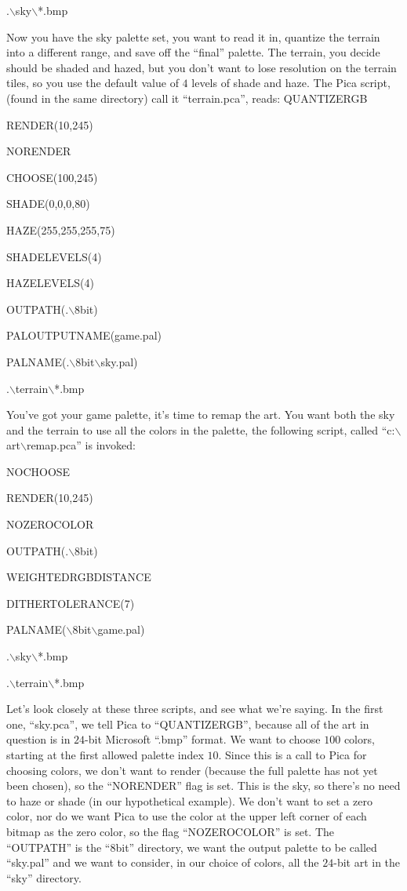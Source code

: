 .$\backslash$sky$\backslash$*.bmp


\newpar Now you have the sky palette set, you want to read it in, quantize the terrain into
a different range, and save off the ``final'' palette. The terrain, you decide should be
shaded and hazed, but you don't want to lose resolution on the terrain tiles, so you use
the default value of $4$ levels of shade and haze. The Pica script, (found in the
same directory) call it ``terrain.pca'', reads:
\vfill\supereject
QUANTIZERGB


RENDER(10,245)


NORENDER


CHOOSE(100,245)


SHADE(0,0,0,80)


HAZE(255,255,255,75)


SHADELEVELS(4)


HAZELEVELS(4)


OUTPATH(.$\backslash$8bit)


PALOUTPUTNAME(game.pal)


PALNAME(.$\backslash$8bit$\backslash$sky.pal)


.$\backslash$terrain$\backslash$*.bmp

\newpar You've got your game palette, it's time to remap the art. You want both the sky
and the terrain to use all the colors in the palette, the following script, called 
``c:$\backslash$art$\backslash$remap.pca'' is invoked:

								
NOCHOOSE


RENDER(10,245)


NOZEROCOLOR


OUTPATH(.$\backslash$8bit)


WEIGHTEDRGBDISTANCE


DITHERTOLERANCE(7)


PALNAME($\backslash$8bit$\backslash$game.pal)


.$\backslash$sky$\backslash$*.bmp


.$\backslash$terrain$\backslash$*.bmp


\newpar Let's look closely at these three scripts, and see what we're saying. In the
first one, ``sky.pca'', we tell Pica to ``QUANTIZERGB'', because all of the art in question
is in $24$-bit Microsoft ``.bmp'' format. We want to choose $100$ colors, starting at the
first allowed palette index	$10$. Since this is a call to Pica for choosing colors, we don't 
want to render (because the full palette has not yet been chosen), so the ``NORENDER'' flag
is set. This is the sky, so there's no need to haze or shade (in our hypothetical example). 
We don't want to set a zero color, nor do we want Pica to use the color at the upper left
corner of each bitmap as the zero color, so the flag ``NOZEROCOLOR'' is set. The ``OUTPATH''
is the ``8bit'' directory, we want the output palette to be called ``sky.pal'' and we want
to consider, in our choice of colors, all the $24$-bit art in the ``sky'' directory.

